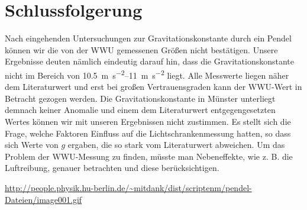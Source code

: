\documentclass[11pt,a4paper,titlepage, ngerman]{article}
\begin{document}
	\section{Schlussfolgerung}
		Nach eingehenden Untersuchungen zur Gravitationskonstante durch ein Pendel können wir die von der WWU gemessenen Größen nicht bestätigen.
		Unsere Ergebnisse deuten nämlich eindeutig darauf hin, dass die Gravitationskonstante nicht im Bereich von \SIrange{10,5}{11}{\meter\per\second\squared} liegt.
		Alle Messwerte liegen näher dem Literaturwert und erst bei großen Vertrauensgraden kann der WWU-Wert in Betracht gezogen werden.
		Die Gravitationskonstante in Münster unterliegt demnach keiner Anomalie und einem dem Literaturwert entgegengesetzten Wertes können wir mit unseren Ergebnissen nicht zustimmen.
		Es stellt sich die Frage, welche Faktoren Einfluss auf die Lichtschrankenmessung hatten, so dass sich Werte von $g$ ergaben, die so stark vom Literaturwert abweichen.
		Um das Problem der WWU-Messung zu finden, müsste man Nebeneffekte, wie z. B. die Luftreibung, genauer betrachten und diese berücksichtigen.
		
		\newpage
		
		\begin{thebibliography}{9}		
			\item[Abbildung 2:] \url{http://people.physik.hu-berlin.de/~mitdank/dist/scriptenm/pendel-Dateien/image001.gif}			
		\end{thebibliography}	
			
\end{document}
